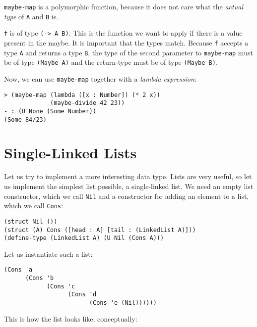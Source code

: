 \documentclass{article}
\begin{document}
\lstinline{maybe-map} is a polymorphic function, because it does not care what the \emph{actual type} of \lstinline{A} and \lstinline{B} is.

\lstinline{f} is of type \lstinline{(-> A B)}. This is the function we want to apply if there is a value present in the maybe. It is important that the types match. Because \lstinline{f} accepts a type \lstinline{A} and returns a type \lstinline{B}, the type of the second parameter to \lstinline{maybe-map} must be of type \lstinline{(Maybe A)} and the return-type must be of type \lstinline{(Maybe B)}.

Now, we can use \lstinline{maybe-map} together with a \emph{lambda expression}:

\begin{lstlisting}
> (maybe-map (lambda ([x : Number]) (* 2 x))
             (maybe-divide 42 23))
- : (U None (Some Number))
(Some 84/23)
\end{lstlisting}

\section{Single-Linked Lists}

Let us try to implement a more interesting data type. Lists are very useful, so let us implement the simplest list possible, a single-linked list. We need an empty list constructor, which we call \lstinline{Nil} and a constructor for adding an element to a list, which we call \lstinline{Cons}:

\begin{lstlisting}
(struct Nil ())
(struct (A) Cons ([head : A] [tail : (LinkedList A)]))
(define-type (LinkedList A) (U Nil (Cons A)))
\end{lstlisting}

Let us instantiate such a list:

\begin{lstlisting}
(Cons 'a
      (Cons 'b
            (Cons 'c
                  (Cons 'd
                        (Cons 'e (Nil))))))
\end{lstlisting}

This is how the list looks like, conceptually:

\begin{center}
\end{center}
\end{document}
